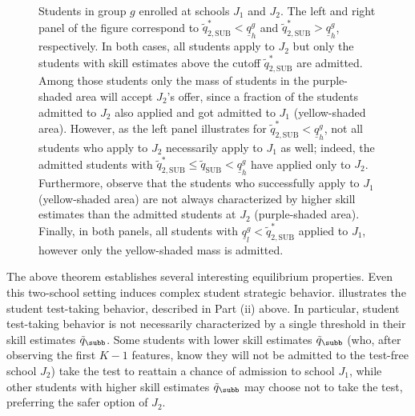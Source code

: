 \begin{figure}
\caption{Students in group $g$ enrolled at schools $J_1$ and $J_2$. The left and right panel of the figure correspond to $\tilde q^*_{2, \textrm{SUB}} < \underline{q}_h^g$ and $\tilde q^*_{2,\textrm{SUB}} > \underline{q}_h^g$, respectively.
In both cases, all students apply to $J_2$ but only the students with skill estimates above the cutoff $\tilde q^*_{2, \textrm{SUB}}$ are admitted. Among those students only the mass of students in the purple-shaded area will accept $J_2$'s offer, since a fraction of the students admitted to $J_2$ also applied and got admitted to $J_1$ (yellow-shaded area). However, as the left panel illustrates for $\tilde q^*_{2, \textrm{SUB}} < \underline{q}_h^g$, not all students who apply to $J_2$ necessarily apply to $J_1$ as well; indeed, the admitted students with $\tilde q^*_{2, \textrm{SUB}} \leq \tilde q_{\textrm{SUB}} <\underline{q}^g_h$ have applied only to $J_2$.
Furthermore, observe that the students who successfully apply to $J_1$ (yellow-shaded area) are not always characterized by higher skill estimates than the admitted students at $J_2$ (purple-shaded area). Finally, in both panels, all students with $\underline{q}_l^g < \tilde q^*_{2, \textrm{SUB}}$ applied to $J_1$, however only the yellow-shaded mass is admitted.}
\label{fig.merit.twoschools.strategic}
\end{figure}


The above theorem establishes several interesting equilibrium properties. Even this two-school setting induces complex student strategic behavior.
 illustrates the student test-taking behavior, described in Part (ii) above.  In particular, student test-taking behavior is not necessarily characterized by a single threshold in their skill estimates $\tilde q_{\subb}$. Some students with lower skill estimates $\tilde q_{\subb}$ (who, after observing the first $K-1$ features, know they will not be admitted to the test-free school $J_2$) take the test to reattain a chance of admission to school $J_1$, {while other students with higher skill estimates $\tilde q_{\subb}$ may choose not to take the test, preferring the safer option of $J_2$.}

